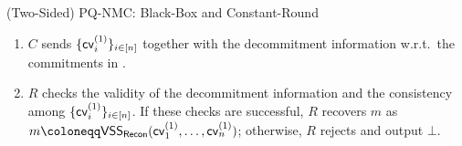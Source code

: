\begin{ProtocolBox}[label={protocol:BB-NMCom:two-sided}]{(Two-Sided) PQ-NMC: Black-Box and Constant-Round}
\begin{enumerate}
\end{enumerate}



\begin{enumerate}
\item
$C$ sends $\{\mathsf{cv}^{(1)}_i\}_{i\in [n]}$ together with the decommitment information w.r.t.\ the commitments in . 
\item
$R$ checks the validity of the decommitment information and the consistency among $\{\mathsf{cv}^{(1)}_i\}_{i\in [n]}$. If these checks are successful, $R$ recovers $m$ as $m \coloneqq \VSS_\Recon(\msf{cv}^{(1)}_1, \ldots, \msf{cv}^{(1)}_n)$; otherwise, $R$ rejects and output $\bot$. 
\end{enumerate}

\end{ProtocolBox}